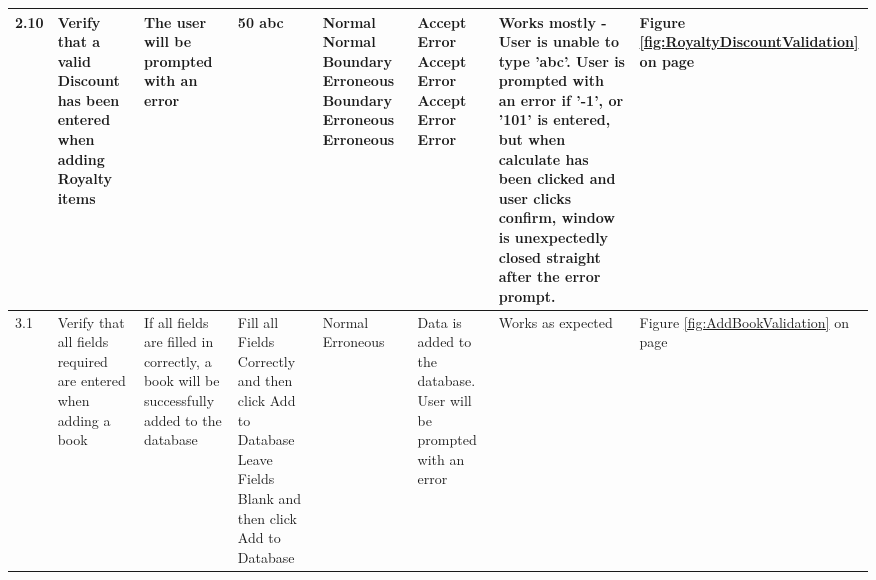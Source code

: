 \begin{landscape}
\begin{center}
\begin{longtable}{|p{1.5cm}|p{2cm}|p{2.5cm}|p{2.5cm}|p{2cm}|p{2cm}|p{2cm}|p{2cm}|}
\rowcolor{lightgray}  2.10 & Verify that a valid Discount has been entered when adding Royalty items & The user will be prompted with an error & 50 \newline 5.5 \newline 0 \newline -1 \newline 100 \newline 101 \newline abc & Normal \newline Normal \newline Boundary \newline Erroneous \newline Boundary \newline Erroneous \newline Erroneous & Accept \newline Error \newline Accept \newline Error \newline Accept \newline Error \newline Error & Works mostly - User is unable to type 'abc'. User is prompted with an error if '-1', or '101' is entered, but when calculate has been clicked and user clicks confirm, window is unexpectedly closed straight after the error prompt. & Figure \ref{fig:RoyaltyDiscountValidation} on page \pageref{fig:RoyaltyDiscountValidation} \\ \hline
        3.1 & Verify that all fields required are entered when adding a book & If all fields are filled in correctly, a book will be successfully added to the database & Fill all Fields Correctly and then click Add to Database \newline Leave Fields Blank and then click Add to Database & Normal \newline Erroneous & Data is added to the database. \newline User will be prompted with an error & Works as expected & Figure \ref{fig:AddBookValidation} on page \pageref{fig:AddBookValidation} \\ \hline

\end{longtable}
\end{center}
\end{landscape}
